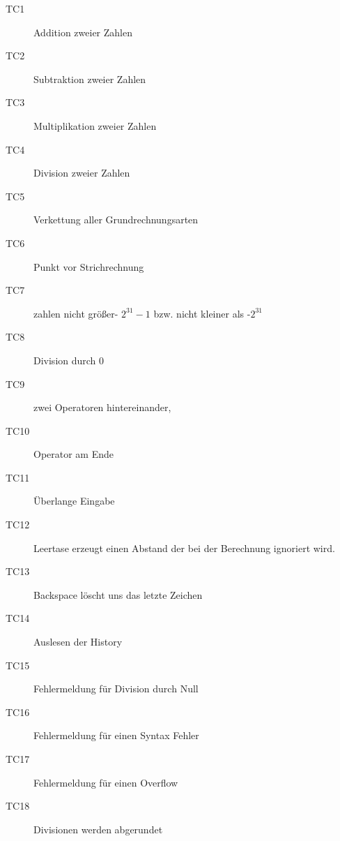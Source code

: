 \begin{description}
 \item[TC1] Addition zweier Zahlen
 \item[TC2] Subtraktion zweier Zahlen
 \item[TC3] Multiplikation zweier Zahlen
 \item[TC4] Division zweier Zahlen
 \item[TC5] Verkettung aller Grundrechnungsarten
 \item[TC6] Punkt vor Strichrechnung
 \item[TC7] zahlen nicht größer- $2^{31}-1$ bzw. nicht kleiner als -$2^{31}$
 \item[TC8] Division durch 0
 \item[TC9] zwei Operatoren hintereinander, 
 \item[TC10] Operator am Ende
 \item[TC11] Überlange Eingabe
 \item[TC12] Leertase erzeugt einen Abstand der bei der Berechnung ignoriert wird.
 \item[TC13] Backspace löscht uns das letzte Zeichen
 \item[TC14] Auslesen der History
 \item[TC15] Fehlermeldung für Division durch Null
 \item[TC16] Fehlermeldung für einen Syntax Fehler
 \item[TC17] Fehlermeldung für einen Overflow
 \item[TC18] Divisionen werden abgerundet
\end{description}

